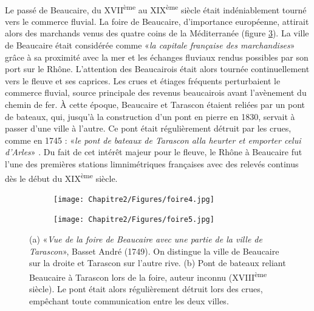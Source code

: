 \paragraph{} Le passé de Beaucaire, du XVII\textsuperscript{ème} au XIX\textsuperscript{ème} siècle était indéniablement tourné vers le commerce fluvial. La foire de Beaucaire, d'importance européenne, attirait alors des marchands venus des quatre coins de la Méditerranée (figure \ref{fig:foire}). La ville de Beaucaire était considérée comme «\textit{la capitale française des marchandises}» \citep{leon_vie_1953} grâce à sa proximité avec la mer et les échanges fluviaux rendus possibles par son port sur le Rhône. L'attention des Beaucairois était alors tournée continuellement vers le fleuve et ses caprices. Les crues et étiages fréquents perturbaient le commerce fluvial, source principale des revenus beaucairois avant l'avènement du chemin de fer. À cette époque, Beaucaire et Tarascon étaient reliées par un pont de bateaux, qui, jusqu'à la construction d'un pont en pierre en 1830, servait à passer d'une ville à l'autre. Ce pont était régulièrement détruit par les crues, comme en 1745 : «\textit{le pont de bateaux de Tarascon alla heurter et emporter celui d'Arles}» \citep{anibert_annales_1764}. Du fait de cet intérêt majeur pour le fleuve, le Rhône à Beaucaire fut l'une des premières stations limnimétriques françaises avec des relevés continus dès le début du XIX\textsuperscript{ème} siècle. 

\begin{figure}[h]
		\centering
            \begin{subfigure}{0.49\linewidth}
            \centering
            	\texttt{[image: Chapitre2/Figures/foire4.jpg]}\hfill
            	\caption{}
            	\label{subfig:foire1}
            \end{subfigure}
            \begin{subfigure}{0.49\linewidth}
            \centering
            	\texttt{[image: Chapitre2/Figures/foire5.jpg]}
            	\caption{}
           		\label{subfig:foire2}
            \end{subfigure}
\caption{(a) «\textit{Vue de la foire de Beaucaire avec une partie de la ville de Tarascon}», Basset André (1749). On distingue la ville de Beaucaire sur la droite et Tarascon sur l'autre rive. 
(b) Pont de bateaux reliant Beaucaire à Tarascon lors de la foire, auteur inconnu (XVIII\textsuperscript{ème} siècle). Le pont était alors régulièrement détruit lors des crues, empêchant toute communication entre les deux villes.}
\label{fig:foire}
\end{figure}

